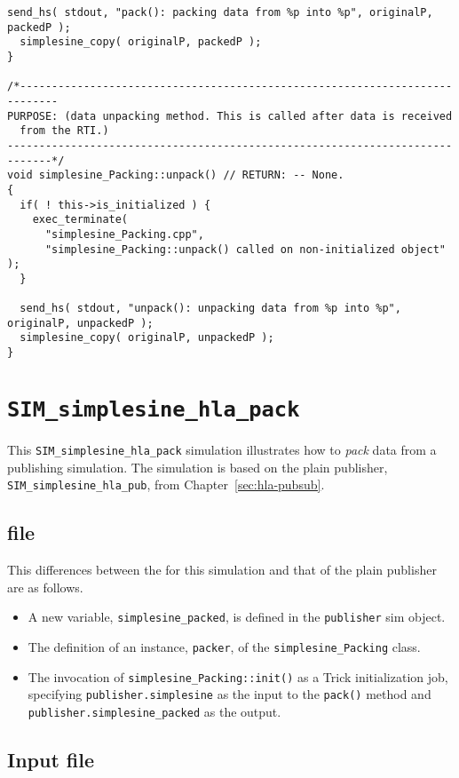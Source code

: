 \begin{lstlisting}[caption={{\tt simplesine\_Packing} class methods}]
  send_hs( stdout, "pack(): packing data from %p into %p", originalP, packedP );
  simplesine_copy( originalP, packedP );
}

/*----------------------------------------------------------------------------
PURPOSE: (data unpacking method. This is called after data is received
  from the RTI.)
-----------------------------------------------------------------------------*/
void simplesine_Packing::unpack() // RETURN: -- None.
{
  if( ! this->is_initialized ) {
    exec_terminate(
      "simplesine_Packing.cpp",
      "simplesine_Packing::unpack() called on non-initialized object" );
  }

  send_hs( stdout, "unpack(): unpacking data from %p into %p", originalP, unpackedP );
  simplesine_copy( originalP, unpackedP );
}
\end{lstlisting}

\section{\tt SIM\_simplesine\_hla\_pack}

This {\tt SIM\_simplesine\_hla\_pack} simulation illustrates how to
{\em pack} data from a publishing simulation.
The simulation is based on the plain publisher,
{\tt SIM\_simplesine\_hla\_pub}, from
Chapter~\ref{sec:hla-pubsub}.

\subsection{\sdefine file}
This differences between the \sdefine for this simulation and that
of the plain publisher are as follows.

\begin{itemize}
\item{
  A new \simplesine variable, {\tt simplesine\_packed},
  is defined in the {\tt publisher} sim object.
}
\item{
  The definition of an instance, {\tt packer},
  of the {\tt simplesine\_Packing} class.
}
\item{
  The invocation of {\tt simplesine\_Packing::init()} as a Trick
  initialization job,
  specifying {\tt publisher.simplesine} as the input to the {\tt pack()}
  method and {\tt publisher.simple\-sine\_\-packed} as the output.
}
\end{itemize}

\subsection{Input file}

